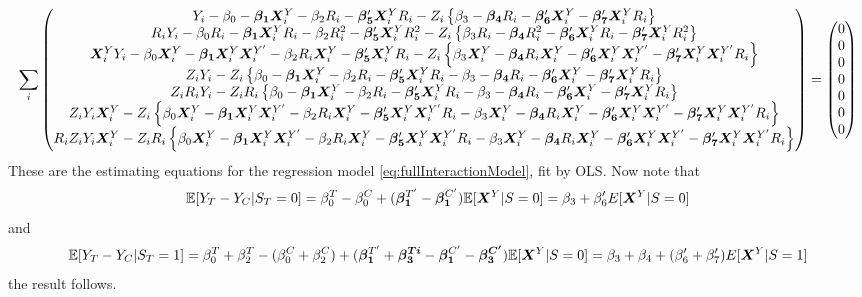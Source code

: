 \documentclass[11pt]{article} %
\begin{document}
\begin{equation*}
  \displaystyle\sum_i \begin{pmatrix}
    Y_i-\beta_0-\bm{\beta_1}\bm{X}^Y_i-\beta_2R_i-\bm{\beta_5}'\bm{X}^Y_iR_i-Z_i\left\{\beta_3-\bm{\beta_4}R_i-\bm{\beta_6}'\bm{X}^Y_i-\bm{\beta_7}'\bm{X}^Y_i R_i\right\}\\
    R_iY_i-\beta_0R_i-\bm{\beta_1}\bm{X}^Y_i R_i-\beta_2R_i^2-\bm{\beta_5}'\bm{X}^Y_iR_i^2-Z_i\left\{\beta_3R_i-\bm{\beta_4}R_i^2-\bm{\beta_6}'\bm{X}^Y_iR_i-\bm{\beta_7}'\bm{X}^Y_i R_i^2\right\}\\
    \bm{X}^Y_i Y_i-\beta_0\bm{X}^Y_i-\bm{\beta_1}\bm{X}^Y_i\bm{X}^{Y'}_i-\beta_2R_i\bm{X}^Y_i-\bm{\beta_5}'\bm{X}^Y_iR_i-Z_i\left\{\beta_3\bm{X}^Y_i-\bm{\beta_4}R_i\bm{X}^Y_i-\bm{\beta_6}'\bm{X}^Y_i\bm{X}^{Y'}_i-\bm{\beta_7}'\bm{X}^Y_i\bm{X}^{Y'}_i R_i\right\}\\
    Z_iY_i-Z_i\left\{\beta_0-\bm{\beta_1}\bm{X}^Y_i-\beta_2R_i-\bm{\beta_5}'\bm{X}^Y_iR_i-\beta_3-\bm{\beta_4}R_i-\bm{\beta_6}'\bm{X}^Y_i-\bm{\beta_7}'\bm{X}^Y_i R_i\right\}\\
    Z_iR_iY_i-Z_iR_i\left\{\beta_0-\bm{\beta_1}\bm{X}^Y_i-\beta_2R_i-\bm{\beta_5}'\bm{X}^Y_iR_i-\beta_3-\bm{\beta_4}R_i-\bm{\beta_6}'\bm{X}^Y_i-\bm{\beta_7}'\bm{X}^Y_i R_i\right\}\\
    Z_iY_i\bm{X}^Y_i-Z_i\left\{\beta_0\bm{X}^Y_i-\bm{\beta_1}\bm{X}^Y_i\bm{X}^{Y'}_i-\beta_2R_i\bm{X}^Y_i-\bm{\beta_5}'\bm{X}^Y_i\bm{X}^{Y'}_iR_i-\beta_3\bm{X}^Y_i-\bm{\beta_4}R_i\bm{X}^Y_i-\bm{\beta_6}'\bm{X}^Y_i\bm{X}^{Y'}_i-\bm{\beta_7}'\bm{X}^Y_i\bm{X}^{Y'}_i R_i\right\}\\
    R_iZ_iY_i\bm{X}^Y_i-Z_iR_i\left\{\beta_0\bm{X}^Y_i-\bm{\beta_1}\bm{X}^Y_i\bm{X}^{Y'}_i-\beta_2R_i\bm{X}^Y_i-\bm{\beta_5}'\bm{X}^Y_i\bm{X}^{Y'}_iR_i-\beta_3\bm{X}^Y_i-\bm{\beta_4}R_i\bm{X}^Y_i-\bm{\beta_6}'\bm{X}^Y_i\bm{X}^{Y'}_i-\bm{\beta_7}'\bm{X}^Y_i\bm{X}^{Y'}_i R_i\right\}
  \end{pmatrix}=\begin{pmatrix} 0\\0\\0\\0\\0\\0\\0\end{pmatrix}
\end{equation*}
These are the estimating equations for the regression model \eqref{eq:fullInteractionModel}, fit by OLS. Now note that
\begin{equation*}
  \mathbb{E}[Y_T-Y_C|S_T=0]=\beta_0^T-\beta_0^C+(\bm{\beta_1}^{T'}-\bm{\beta_1}^{C'})\mathbb{E}[\bm{X}^Y|S=0]=\beta_3+\beta_6'E[\bm{X}^Y|S=0]
\end{equation*}
and
\begin{equation*}
  \mathbb{E}[Y_T-Y_C|S_T=1]=\beta_0^T+\beta_2^T-(\beta_0^C+\beta_2^C)+(\bm{\beta_1}^{T'}+\bm{\beta_3^{Ti}}-\bm{\beta_1}^{C'}-\bm{\beta_3^{C'}})\mathbb{E}[\bm{X}^Y|S=0]=\beta_3+\beta_4+(\beta_6'+\beta_7')E[\bm{X}^Y|S=1]
\end{equation*}
the result follows.
\end{document}
